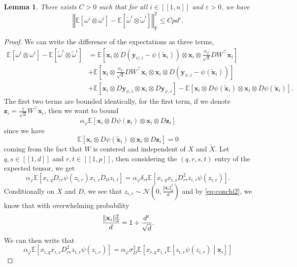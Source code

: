 \documentclass[letterpaper, 10pt, dvipsnames]{article}
\numberwithin{equation}{section}
\newcommand{\x}{\mathbf{x}}
\newcommand{\y}{\mathbf{y}}
\newcommand{\z}{\mathbf{z}}
\renewcommand{\epsilon}{\varepsilon}
\renewcommand{\phi}{\varphi}
\newcommand{\wt}{\widetilde}
\let\O\relax
\newcommand{\O}[1]{\mathcal{O}\left(#1\right)}
\newcommand{\E}{\mathds{E}}
\newcommand{\unn}[2]{[\![#1,#2]\!]}
\newtheorem{lem}[ccounter]{Lemma}
\theoremstyle{definition}
\begin{document}
  \begin{lem}\label{lem:compareexpect}
    There exists $C>0$ such that for all $i\in\unn{1}{n}$ and $\varepsilon>0$, we have 
    \begin{equation}
    \left\Vert
      \E\left[\omega^i\otimes \omega^i\right]-\E\left[\wt{\omega}^i\otimes \wt{\omega}^i\right]
    \right\Vert_{\mathrm{F}}^2\leqslant Cp d^{\epsilon}.  
    \end{equation}
  \end{lem}
  \begin{proof}
    We can write the difference of the expectations as three terms,
    \begin{align*}
      \E\left[\omega^i\otimes \omega^i\right]-\E\left[\wt{\omega}^i\otimes \wt{\omega}^i\right] 
      &=
      \E\left[\x_i \otimes D\left(\y_{\psi,i}-\psi(\wt{\x}_{i})\right)\otimes \x_i\otimes \frac{\alpha_\phi}{\sqrt{d}}DW^\top \x_i\right]\\
      & + \E\left[\x_i \otimes \frac{\alpha_\phi}{\sqrt{d}}DW^\top \x_i\otimes \x_i\otimes  D\left(\y_{\psi,i}-\psi(\wt{\x}_{i})\right)\right]\\
      &+ \E\left[\x_i \otimes D\y_{\psi,i}\otimes \x_i\otimes D\y_{\psi,i}\right] -\E\left[\x_i \otimes D\psi(\wt{\x}_{i})\otimes \x_i\otimes D\psi(\wt{\x}_{i})\right]. 
    \end{align*}
    The first two terms are bounded identically, for the first term, if we denote $\z_i = \frac{1}{\sqrt{d}}W^\top \x_i$, then we want to bound 
    \[
    \alpha_\phi\E\left[\x_i\otimes D\psi(\z_i)\otimes \x_i\otimes D\z_i\right]  
    \]
    since we have
    \[
    \E\left[\x_i\otimes D\psi(\wt{\x}_{i})\otimes \x_i \otimes D\z_i\right]=0  
    \]
    coming from the fact that $W$ is centered and independent of $X$ and $\wt{X}$. Let $q,s\in\unn{1}{d}$ and $r,t\in\unn{1}{p}$, then considering the $(q,r,s,t)$ entry of the expected tensor, we get 
    \[
    \alpha_\phi\E\left[x_{i,q}D_{rr}\psi(z_{i,r})x_{i,s}D_{tt}z_{i,t}\right] = \alpha_\phi\delta_{rt} \E\left[x_{i,q}x_{i,s}D_{rr}^2z_{i,r}\psi(z_{i,r})\right].  
    \]
    Conditionally on $X$ and $D$, we see that $z_{i,r}\sim \mathcal{N}\left(0,\frac{\Vert \x_i\Vert_2^2}{d}\right)$ and by \eqref{eq:conchi2}, we know that with overwhelming probability 
    \[
    \frac{\Vert \x_i\Vert_2^2}{d}=1+\O{\frac{d^\varepsilon}{\sqrt{d}}}.  
    \]
    We can then write that 
    \[
    \alpha_\phi \E\left[x_{i,q}x_{i,s}D_{rr}^2 z_{i,r}\psi(z_{i,r})\right] 
    =
    \alpha_\phi\sigma_D^2 \E\left[x_{i,q}x_{i,s}\E\left[z_{i,r}\psi(z_{i,r})\middle\vert \x_i\right]\right] 
\]
\end{proof}
\end{document}
